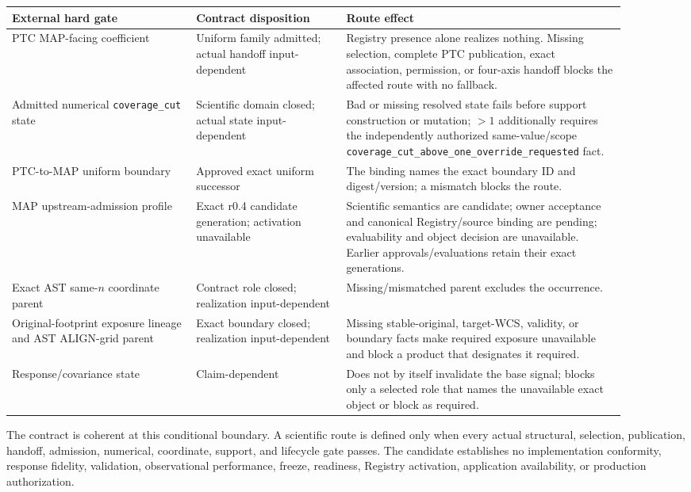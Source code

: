 \documentclass[10pt]{article}
\newcommand{\code}[1]{\nolinkurl{#1}}
\begin{document}
\begin{longtable}{L{0.27\linewidth}L{0.22\linewidth}L{0.41\linewidth}}
\toprule
External hard gate & Contract disposition & Route effect\\
\midrule
PTC MAP-facing coefficient & Uniform family admitted; actual handoff input-dependent & Registry presence alone realizes nothing. Missing selection, complete PTC publication, exact association, permission, or four-axis handoff blocks the affected route with no fallback.\\
Admitted numerical \code{coverage\_cut} state & Scientific domain closed; actual state input-dependent & Bad or missing resolved state fails before support construction or mutation; \(>1\) additionally requires the independently authorized same-value/scope \code{coverage_cut_above_one_override_requested} fact.\\
PTC-to-MAP uniform boundary & Approved exact uniform successor & The binding names the exact boundary ID and digest/version; a mismatch blocks the route.\\
MAP upstream-admission profile & Exact r0.4 candidate generation; activation unavailable & Scientific semantics are candidate; owner acceptance and canonical Registry/source binding are pending; evaluability and object decision are unavailable. Earlier approvals/evaluations retain their exact generations.\\
Exact AST same-\(n\) coordinate parent & Contract role closed; realization input-dependent & Missing/mismatched parent excludes the occurrence.\\
Original-footprint exposure lineage and AST ALIGN-grid parent & Exact boundary closed; realization input-dependent & Missing stable-original, target-WCS, validity, or boundary facts make required exposure unavailable and block a product that designates it required.\\
Response/covariance state & Claim-dependent & Does not by itself invalidate the base signal; blocks only a selected role that names the unavailable exact object or block as required.\\
\bottomrule
\end{longtable}

The contract is coherent at this conditional boundary. A scientific route is
defined only when every actual structural, selection, publication, handoff,
admission, numerical, coordinate, support, and lifecycle gate passes. The
candidate establishes no implementation conformity, response fidelity,
validation, observational performance, freeze, readiness, Registry activation,
application availability, or production authorization.
\end{document}
